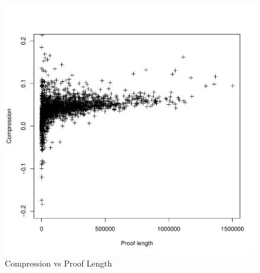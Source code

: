 \documentclass{beamer}
\begin{document}
\begin{frame}
\begin{figure}[h]
	\centering
	\includegraphics[scale=0.5]{../latex/chapters/congruence/figures/compression_vs_length.pdf}
	\caption{Compression vs Proof Length}
	\label{fig:congruence_compression}
\end{figure}

\end{frame}
\end{document}
